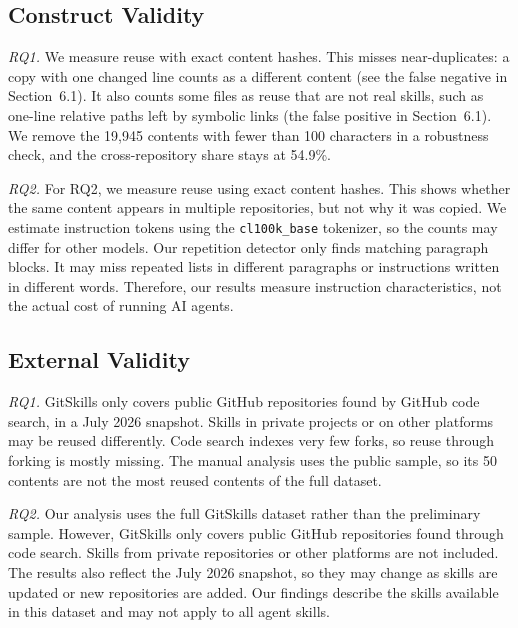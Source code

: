 \documentclass[sigconf,review]{acmart}
\begin{document}
\subsection{Construct Validity}
\textit{RQ1.}
We measure reuse with exact content hashes.
This misses near-duplicates: a copy with one changed line counts as a different content (see the false negative in Section~6.1).
It also counts some files as reuse that are not real skills, such as one-line relative paths left by symbolic links (the false positive in Section~6.1).
We remove the 19{,}945 contents with fewer than 100 characters in a robustness check, and the cross-repository share stays at 54.9\%.


\textit{RQ2.}
For RQ2, we measure reuse using exact content hashes.
This shows whether the same content appears in multiple
repositories, but not why it was copied. We estimate
instruction tokens using the \texttt{cl100k\_base} tokenizer,
so the counts may differ for other models. Our repetition
detector only finds matching paragraph blocks. It may miss
repeated lists in different paragraphs or instructions
written in different words. Therefore, our results measure
instruction characteristics, not the actual cost of
running AI agents.

\subsection{External Validity}
\textit{RQ1.}
GitSkills only covers public GitHub repositories found by GitHub code search, in a July 2026 snapshot.
Skills in private projects or on other platforms may be reused differently.
Code search indexes very few forks, so reuse through forking is mostly missing.
The manual analysis uses the public sample, so its 50 contents are not the most reused contents of the full dataset.


\textit{RQ2.}
Our analysis uses the full GitSkills dataset rather than
the preliminary sample. However, GitSkills only covers
public GitHub repositories found through code search.
Skills from private repositories or other platforms are
not included. The results also reflect the July 2026
snapshot, so they may change as skills are updated or
new repositories are added. Our findings describe the
skills available in this dataset and may not apply to
all agent skills.

\end{document}
